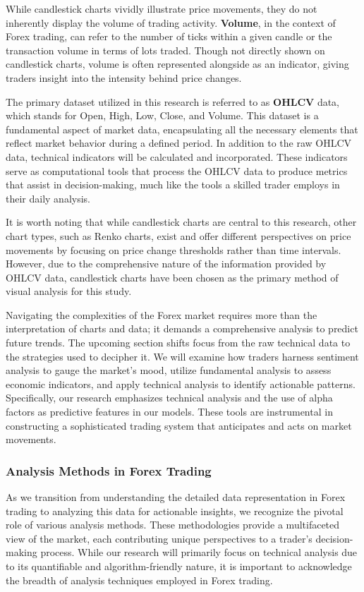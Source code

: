 While candlestick charts vividly illustrate price movements, they do not inherently display the volume of trading activity. \textbf{Volume}, in the context of Forex trading, can refer to the number of ticks within a given candle or the transaction volume in terms of lots traded. Though not directly shown on candlestick charts, volume is often represented alongside as an indicator, giving traders insight into the intensity behind price changes.

The primary dataset utilized in this research is referred to as \textbf{OHLCV} data, which stands for Open, High, Low, Close, and Volume. This dataset is a fundamental aspect of market data, encapsulating all the necessary elements that reflect market behavior during a defined period. In addition to the raw OHLCV data, technical indicators will be calculated and incorporated. These indicators serve as computational tools that process the OHLCV data to produce metrics that assist in decision-making, much like the tools a skilled trader employs in their daily analysis.

It is worth noting that while candlestick charts are central to this research, other chart types, such as Renko charts, exist and offer different perspectives on price movements by focusing on price change thresholds rather than time intervals. However, due to the comprehensive nature of the information provided by OHLCV data, candlestick charts have been chosen as the primary method of visual analysis for this study.

Navigating the complexities of the Forex market requires more than the interpretation of charts and data; it demands a comprehensive analysis to predict future trends. The upcoming section shifts focus from the raw technical data to the strategies used to decipher it. We will examine how traders harness sentiment analysis to gauge the market's mood, utilize fundamental analysis to assess economic indicators, and apply technical analysis to identify actionable patterns. Specifically, our research emphasizes technical analysis and the use of alpha factors as predictive features in our models. These tools are instrumental in constructing a sophisticated trading system that anticipates and acts on market movements.

\subsubsection{Analysis Methods in Forex Trading}

As we transition from understanding the detailed data representation in Forex trading to analyzing this data for actionable insights, we recognize the pivotal role of various analysis methods. These methodologies provide a multifaceted view of the market, each contributing unique perspectives to a trader's decision-making process. While our research will primarily focus on technical analysis due to its quantifiable and algorithm-friendly nature, it is important to acknowledge the breadth of analysis techniques employed in Forex trading.

